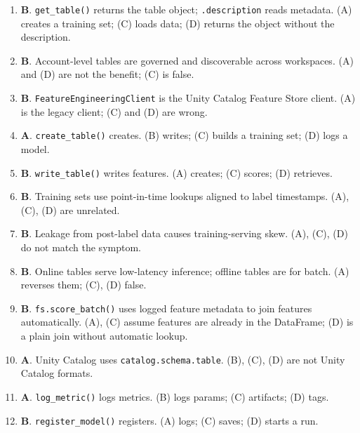 \documentclass[11pt]{article}
\begin{document}
	\begin{enumerate}[leftmargin=*, label=\textbf{Q\arabic*.}]
		
		\item \textbf{B}. \texttt{get\_table()} returns the table object; \texttt{.description} reads metadata. (A) creates a training set; (C) loads data; (D) returns the object without the description.
		
		\item \textbf{B}. Account-level tables are governed and discoverable across workspaces. (A) and (D) are not the benefit; (C) is false.
		
		\item \textbf{B}. \texttt{FeatureEngineeringClient} is the Unity Catalog Feature Store client. (A) is the legacy client; (C) and (D) are wrong.
		
		\item \textbf{A}. \texttt{create\_table()} creates. (B) writes; (C) builds a training set; (D) logs a model.
		
		\item \textbf{B}. \texttt{write\_table()} writes features. (A) creates; (C) scores; (D) retrieves.
		
		\item \textbf{B}. Training sets use point-in-time lookups aligned to label timestamps. (A), (C), (D) are unrelated.
		
		\item \textbf{B}. Leakage from post-label data causes training-serving skew. (A), (C), (D) do not match the symptom.
		
		\item \textbf{B}. Online tables serve low-latency inference; offline tables are for batch. (A) reverses them; (C), (D) false.
		
		\item \textbf{B}. \texttt{fs.score\_batch()} uses logged feature metadata to join features automatically. (A), (C) assume features are already in the DataFrame; (D) is a plain join without automatic lookup.
		
		\item \textbf{A}. Unity Catalog uses \texttt{catalog.schema.table}. (B), (C), (D) are not Unity Catalog formats.
		
		\item \textbf{A}. \texttt{log\_metric()} logs metrics. (B) logs params; (C) artifacts; (D) tags.
		
		\item \textbf{B}. \texttt{register\_model()} registers. (A) logs; (C) saves; (D) starts a run.
		

\end{enumerate}
\end{document}
